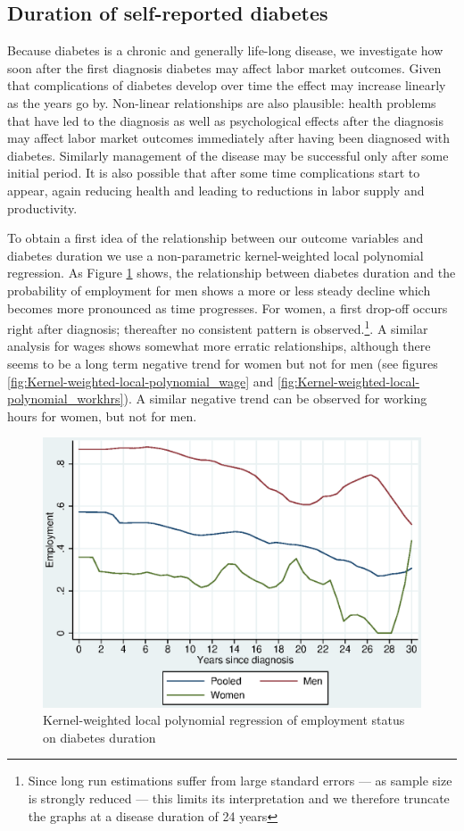 \documentclass[12pt,english]{article}
\begin{document}
{\FloatBarrier

\subsection{Duration of self-reported  diabetes }


Because diabetes is a chronic and generally life-long disease, we investigate how soon after the first diagnosis diabetes may affect labor market outcomes. Given that complications of diabetes develop over time the effect may increase linearly as the years go by. Non-linear relationships are also plausible: health problems that have led to the diagnosis as well as psychological effects after the diagnosis may affect labor market outcomes immediately after having been diagnosed with diabetes. Similarly management of the disease may be successful only after some initial period. It is also possible that after some time complications start to appear, again reducing health and leading to reductions in labor supply and productivity.


To obtain a first idea of the relationship between our outcome variables and diabetes duration we use a non-parametric kernel-weighted local polynomial regression. As Figure \ref{fig:Kernel-weighted-local-polynomial_empl} shows, the relationship between diabetes duration and the probability of employment for men shows a more or less steady decline which becomes more pronounced as time progresses. For women,
a first drop-off occurs right after diagnosis; thereafter no consistent pattern is observed.\footnote{Since long run estimations suffer from large standard errors --- as sample size is strongly reduced --- this limits its interpretation and we therefore truncate the graphs at a disease duration of 24 years}. A similar analysis for wages shows somewhat more erratic relationships, although there seems to be a long term negative trend for women but not for men (see figures \ref{fig:Kernel-weighted-local-polynomial_wage} and \ref{fig:Kernel-weighted-local-polynomial_workhrs}).  A similar negative trend can be observed for working hours for women, but not for men.

  

\begin{figure}[h!]
\caption{\label{fig:Kernel-weighted-local-polynomial_empl}Kernel-weighted local
polynomial regression of employment status on diabetes duration}%
\begin{center}
\includegraphics[width=0.5\columnwidth]{figures/lpoly_works_diabetesduration/lpoly_works_diabetesduration.eps}
\end{center}
\end{figure}

}
\end{document}
